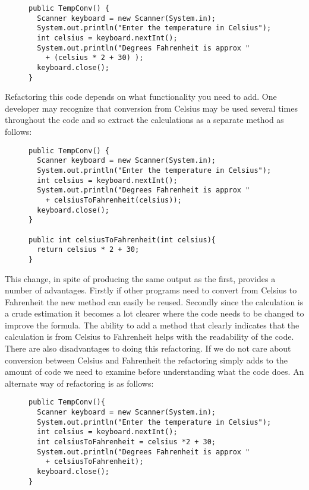 \begin{figure}[!t]
\begin{lstlisting}
public TempConv() {
  Scanner keyboard = new Scanner(System.in);
  System.out.println("Enter the temperature in Celsius");
  int celsius = keyboard.nextInt();
  System.out.println("Degrees Fahrenheit is approx " 
    + (celsius * 2 + 30) );
  keyboard.close();
}
\end{lstlisting}
\end{figure}

Refactoring this code depends on what functionality you need to add. One developer may recognize that conversion from Celsius may be used several times throughout the code and so extract the calculations as a separate method as follows:

\begin{figure}[!t]
\begin{lstlisting}
public TempConv() {
  Scanner keyboard = new Scanner(System.in);
  System.out.println("Enter the temperature in Celsius");
  int celsius = keyboard.nextInt();
  System.out.println("Degrees Fahrenheit is approx " 
    + celsiusToFahrenheit(celsius));
  keyboard.close();
}

public int celsiusToFahrenheit(int celsius){
  return celsius * 2 + 30;
}
\end{lstlisting}
\end{figure}

This change, in spite of producing the same output as the first, provides a number of advantages. Firstly if other programs need to convert from Celsius to Fahrenheit the new method can easily be reused. Secondly since the calculation is a crude estimation it becomes a lot clearer where the code needs to be changed to improve the formula. The ability to add a method that clearly indicates that the calculation is from Celsius to Fahrenheit helps with the readability of the code. There are also disadvantages to doing this refactoring. If we do not care about conversion between Celsius and Fahrenheit the refactoring simply adds to the amount of code we need to examine before understanding what the code does. An alternate way of refactoring is as follows:

\begin{figure}[!t]
\begin{lstlisting}
public TempConv(){
  Scanner keyboard = new Scanner(System.in);
  System.out.println("Enter the temperature in Celsius");
  int celsius = keyboard.nextInt();
  int celsiusToFahrenheit = celsius *2 + 30;
  System.out.println("Degrees Fahrenheit is approx " 
    + celsiusToFahrenheit);
  keyboard.close();
}
\end{lstlisting}
\end{figure}

